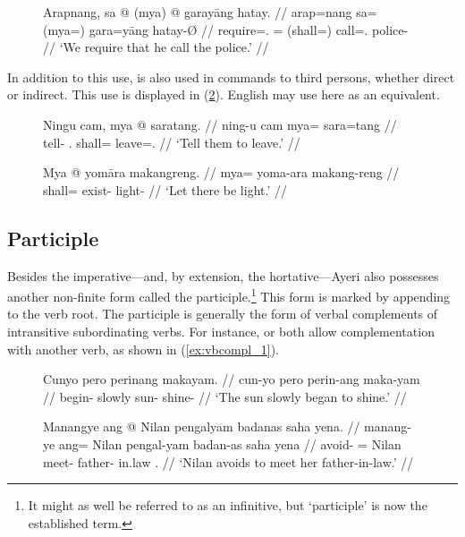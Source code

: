 \begin{figure}[h]
\ex\label{ex:myashall_2}\begingl
	\gla Arapnang, sa @ \textup{(}mya\textup{)} @ garayāng hatay. //
	\glb arap=nang sa= (mya=) gara=yāng hatay-Ø //
	\glc require=\Fpl{}.\Aarg{} \PatT{}= (shall=) call=\TsgM{}.\Aarg{}
	police-\Top{} //
	\glft `We require that he call the police.' //
\endgl\xe
\end{figure}

In addition to this use,  is also used in commands to third
persons, whether direct or indirect. This use is displayed in
(\ref{ex:indirimp}). English may use  here as an equivalent.

\begin{figure}[h]
\pex\label{ex:indirimp}
\a\begingl
	\gla Ningu cam, mya @ saratang. //
	\glb ning-u cam mya= sara=tang //
	\glc tell-\Imp{} \TplM{}.\Dat{} shall= leave=\TplM{}.\Aarg{} //
	\glft `Tell them to leave.' //
\endgl


\a\begingl
	\gla Mya @ yomāra makangreng. //
	\glb mya= yoma-ara makang-reng //
	\glc shall= exist-\TsgI{} light-\AargI{} //
	\glft `Let there be light.' //
\endgl
\xe
\end{figure}


\subsection{Participle}
\label{subsec:participle}
Besides the imperative---and, by extension, the hortative---Ayeri also
possesses another non-finite form called the participle.\footnote{It might as
well be referred to as an infinitive, but `participle' is now the established
term.} This form is marked by appending  to the verb root. The
participle is generally the form of verbal complements of intransitive
subordinating verbs. For instance,  or
 both allow complementation with another verb, as
shown in (\ref{ex:vbcompl_1}).

\begin{figure}[h]
\pex\label{ex:vbcompl_1}
\a\label{ex:intrcompl_1}\begingl
	\gla Cunyo pero perinang makayam. // 
	\glb cun-yo pero perin-ang maka-yam // 
	\glc begin-\TsgN{} slowly sun-\Aarg{} shine-\Ptcp{} //
	\glft `The sun slowly began to shine.' //
\endgl

\a\label{ex:trcompl_1}\begingl
	\gla Manangye ang @ Nilan pengalyam badanas saha yena. //
	\glb manang-ye ang= Nilan pengal-yam badan-as saha yena //
	\glc avoid-\TsgF{} \Aarg{}= Nilan meet-\Ptcp{} father-\Parg{} in.law 
		\TsgF{}.\Gen{} //
	\glft `Nilan avoids to meet her father-in-law.' //
\endgl
\xe
\end{figure}

